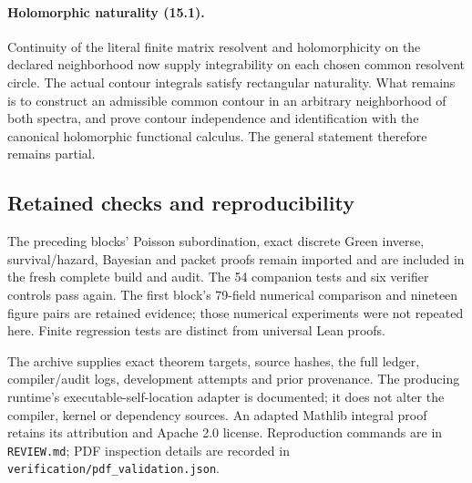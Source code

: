\paragraph{Holomorphic naturality (15.1).}
Continuity of the literal finite matrix resolvent and holomorphicity on the declared
neighborhood now supply integrability on each chosen common resolvent circle.
The actual contour integrals satisfy rectangular naturality. What remains is to
construct an admissible common contour in an arbitrary neighborhood of both spectra,
and prove contour independence and identification with the canonical holomorphic
functional calculus. The general statement therefore remains partial.

\subsection*{Retained checks and reproducibility}
The preceding blocks' Poisson subordination, exact discrete Green inverse,
survival/hazard, Bayesian and packet proofs remain imported and are included in the
fresh complete build and audit. The 54 companion tests and six verifier controls
pass again. The first block's 79-field numerical comparison and nineteen figure
pairs are retained evidence; those numerical experiments were not repeated here.
Finite regression tests are distinct from universal Lean proofs.

The archive supplies exact theorem targets, source hashes, the full ledger,
compiler/audit logs, development attempts and prior provenance. The producing
runtime's executable-self-location adapter is documented; it does not alter the
compiler, kernel or dependency sources. An adapted Mathlib integral proof retains
its attribution and Apache 2.0 license. Reproduction commands are in
\texttt{REVIEW.md}; PDF inspection details are recorded in
\texttt{verification/pdf\_validation.json}.
